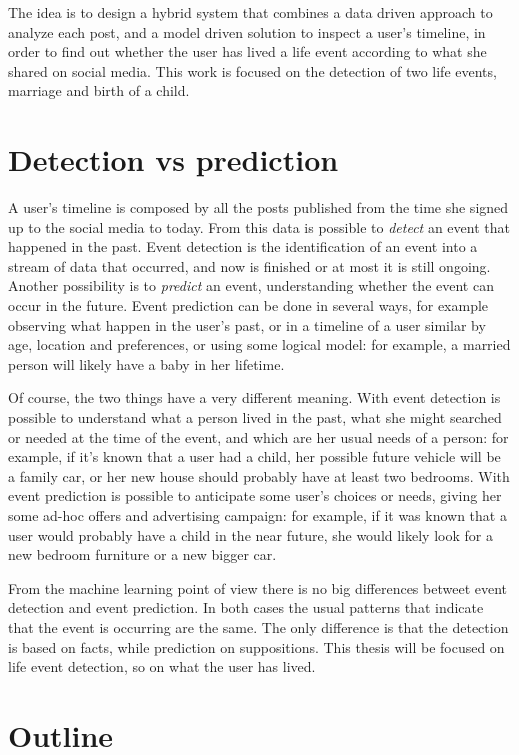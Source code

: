 The idea is to design a hybrid system that combines a data driven approach to analyze each post, and a model driven solution to inspect a user's timeline, in order to find out whether the user has lived a life event according to what she shared on social media. This work is focused on the detection of two life events, marriage and birth of a child.

\section{Detection vs prediction}

A user's timeline is composed by all the posts published from the time she signed up to the social media to today. From this data is possible to \textit{detect} an event that happened in the past. Event detection is the identification of an event into a stream of data that occurred, and now is finished or at most it is still ongoing. Another possibility is to \textit{predict} an event, understanding whether the event can occur in the future. Event prediction can be done in several ways, for example observing what happen in the user's past, or in a timeline of a user similar by age, location and preferences, or using some logical model: for example, a married person will likely have a baby in her lifetime.

Of course, the two things have a very different meaning. With event detection is possible to understand what a person lived in the past, what she might searched or needed at the time of the event, and which are her usual needs of a person: for example, if it's known that a user had a child, her possible future vehicle will be a family car, or her new house should probably have at least two bedrooms. With event prediction is possible to anticipate some user's choices or needs, giving her some ad-hoc offers and advertising campaign: for example, if it was known that a user would probably have a child in the near future, she would likely look for a new bedroom furniture or a new bigger car.

From the machine learning point of view there is no big differences betweet event detection and event prediction. In both cases the usual patterns that indicate that the event is occurring are the same. The only difference is that the detection is based on facts, while prediction on suppositions. This thesis will be focused on life event detection, so on what the user has lived.

\section{Outline}

